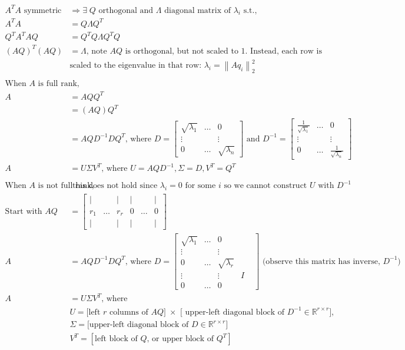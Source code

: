 \documentclass{article}
\newcommand{\norm}[2]{\left\lVert#1\right\rVert_#2}
\begin{document}
\begin{align*}
    A^TA \textrm{ symmetric} &\Rightarrow \exists \; Q \textrm{ orthogonal and } \Lambda \textrm{ diagonal matrix of $\lambda_i$ s.t., }\\
    A^TA & = Q\Lambda Q^T\\
    Q^TA^TAQ & = Q^TQ\Lambda Q^TQ\\
    (AQ)^T(AQ) & = \Lambda \textrm{, note $AQ$ is orthogonal, but not scaled to 1. Instead, each row is} \\
    &\textrm{scaled to the eigenvalue in that row: }\lambda_i  = \norm{Aq_i}{2}^2\\
    \\
    \textrm{When $A$ is full rank,}&\\
    A &= AQQ^T\\
    &= (AQ) Q^T\\
    &= AQD^{-1}DQ^T \textrm{, where } D = \begin{bmatrix} \sqrt{\lambda_1} & \dots & 0\\ 
        \vdots & & \vdots\\ 0 & \dots & \sqrt{\lambda_n} \end{bmatrix} \textrm{ and } D^{-1} = \begin{bmatrix} \frac{1}{\sqrt{\lambda_1}} & \dots & 0\\ 
        \vdots & & \vdots\\ 0 & \dots & \frac{1}{\sqrt{\lambda_n}} \end{bmatrix}\\
    A &= U\Sigma V^T \textrm{, where } U  = AQD^{-1}, \Sigma = D, V^T = Q^T\\
    \\
    \textrm{When $A$ is not full rank,}&\textrm{ this does not hold since $\lambda_i = 0$ for some $i$ so we cannot construct $U$ with $D^{-1}$}\\
    \textrm{Start with } AQ &= \begin{bmatrix} \vert & & \vert & \vert & & \vert\\ 
        r_1 & \dots & r_r & 0 & \dots & 0\\
        \vert & & \vert & \vert & & \vert\end{bmatrix}\\
        A &= AQD^{-1}DQ^T \textrm{, where } D = \begin{bmatrix} \sqrt{\lambda_1} & \dots & 0 \\ 
        \vdots & & \vdots\\ 0 & \dots & \sqrt{\lambda_r} & & \\ 
        \vdots & & \vdots & I\\
        0 & \dots & 0 \end{bmatrix} \textrm{ (observe this matrix has inverse, $D^{-1}$)}\\
    A &= U\Sigma V^T \textrm{, where }\\
    &U  = \textrm{[left $r$ columns of $AQ] \; \times$ [ upper-left diagonal block of $D^{-1} \in \mathbb{R}^{r\times r}$], }\\
    &\Sigma = \textrm{[upper-left diagonal block of } D \in \mathbb{R}^{r\times r}]\\
    &V^T = [\textrm{left block of $Q$, or upper block of $Q^T$}]
\end{align*}
\end{document}
